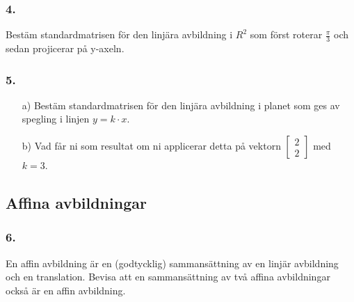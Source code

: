 \documentclass{article}
\begin{document}
\subsubsection*{4.}
Bestäm standardmatrisen för den linjära avbildning i $R^2$ som först roterar $\frac{\pi}{3}$ och sedan projicerar på y-axeln.

\subsubsection*{5.}
\begin{itemize}
	\item[a) ] Bestäm standardmatrisen för den linjära avbildning i planet som ges av spegling i linjen $y=k \cdot x$. 
	\item[b) ] Vad får ni som resultat om ni applicerar detta på vektorn $\begin{bmatrix}2 \\ 2\end{bmatrix}$ med $k=3$.
\end{itemize}

\subsection*{Affina avbildningar}
\subsubsection*{6.}
En affin avbildning är en (godtycklig) sammansättning av en linjär avbildning och en
translation. Bevisa att en sammansättning av två affina avbildningar också är en affin avbildning.
\end{document}
